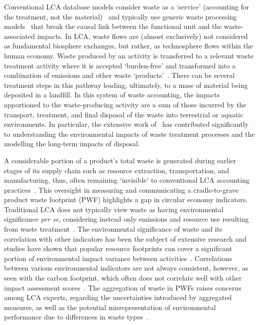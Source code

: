 Conventional LCA database models consider waste as a `service' (accounting for the treatment, not the material)~\citep{guinee2021wasteisnotaservice} and typically use generic waste processing models~\citep{beylot2018} that break the causal link between the functional unit and the waste-associated impacts. In LCA, waste flows are (almost exclusively) not considered as fundamental biosphere exchanges, but rather, as technosphere flows within the human economy. Waste produced by an activity is transferred to a relevant waste treatment activity where it is accepted `burden-free' and transformed into a combination of emissions and other waste `products'~\citep{guinee2021wasteisnotaservice}. There can be several treatment steps in this pathway leading, ultimately, to a mass of material being deposited in a landfill. In this system of waste accounting, the impacts apportioned to the waste-producing activity are a sum of those incurred by the transport, treatment, and final disposal of the waste into terrestrial or aquatic environments. In particular, the extensive work of~\cite{doka2024publications} has contributed significantly to understanding the environmental impacts of waste treatment processes and the modelling the long-term impacts of disposal.

A considerable portion of a product's total waste is generated during earlier stages of its supply chain such as resource extraction, transportation, and manufacturing, thus, often remaining `invisible' to conventional LCA accounting practices~\citep{laurenti2016wastefootprint}. This oversight in measuring and communicating a cradle-to-grave product waste footprint (PWF) highlights a gap in circular economy indicators. Traditional LCA does not typically view waste as having environmental significance \textit{per se}, considering instead only emissions and resource use resulting from waste treatment~\citep{bisinella2024wastelca, laurenti2023wastefootprint}. The environmental significance of waste and its correlation with other indicators has been the subject of extensive research and studies have shown that popular resource footprints can cover a significant portion of environmental impact variance between activities~\citep{steinmann2017resourcefootprints,laurenti2023wastefootprint}. Correlations between various environmental indicators are not always consistent, however, as seen with the carbon footprint, which often does not correlate well with other impact assessment scores~\citep{laurenti2012carbonfootprint}. The aggregation of waste in PWFs raises concerns among LCA experts, regarding the uncertainties introduced by aggregated measures, as well as the potential misrepresentation of environmental performance due to differences in waste types~\citep{chen2021methoduncertainty,huijbregts2010energyfootprint}.

